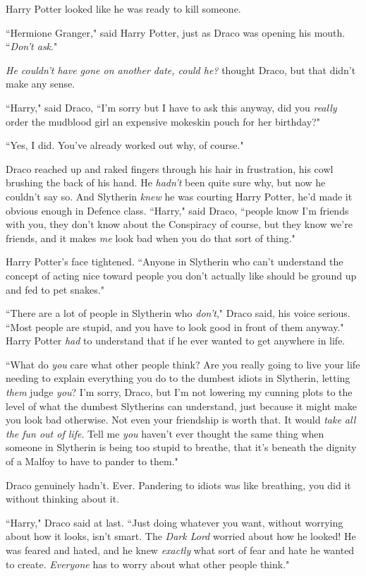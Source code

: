 Harry Potter looked like he was ready to kill someone.

``Hermione Granger," said Harry Potter, just as Draco was opening his mouth. ``\emph{Don't ask}."

\emph{He couldn't have gone on another date, could he?} thought Draco, but that didn't make any sense.

``Harry," said Draco, ``I'm sorry but I have to ask this anyway, did you \emph{really} order the mudblood girl an expensive mokeskin pouch for her birthday?"

``Yes, I did. You've already worked out why, of course."

Draco reached up and raked fingers through his hair in frustration, his cowl brushing the back of his hand. He \emph{hadn't} been quite sure why, but now he couldn't say so. And Slytherin \emph{knew} he was courting Harry Potter, he'd made it obvious enough in Defence class. ``Harry," said Draco, ``people know I'm friends with you, they don't know about the Conspiracy of course, but they know we're friends, and it makes \emph{me} look bad when you do that sort of thing."

Harry Potter's face tightened. ``Anyone in Slytherin who can't understand the concept of acting nice toward people you don't actually like should be ground up and fed to pet snakes."

``There are a lot of people in Slytherin who \emph{don't}," Draco said, his voice serious. ``Most people are stupid, and you have to look good in front of them anyway." Harry Potter \emph{had} to understand that if he ever wanted to get anywhere in life.

``What do \emph{you} care what other people think? Are you really going to live your life needing to explain everything you do to the dumbest idiots in Slytherin, letting \emph{them} judge \emph{you}? I'm sorry, Draco, but I'm not lowering my cunning plots to the level of what the dumbest Slytherins can understand, just because it might make you look bad otherwise. Not even your friendship is worth that. It would \emph{take all the fun out of life}. Tell me \emph{you} haven't ever thought the same thing when someone in Slytherin is being too stupid to breathe, that it's beneath the dignity of a Malfoy to have to pander to them."

Draco genuinely hadn't. Ever. Pandering to idiots was like breathing, you did it without thinking about it.

``Harry," Draco said at last. ``Just doing whatever you want, without worrying about how it looks, isn't smart. The \emph{Dark Lord} worried about how he looked! He was feared and hated, and he knew \emph{exactly} what sort of fear and hate he wanted to create. \emph{Everyone} has to worry about what other people think."

